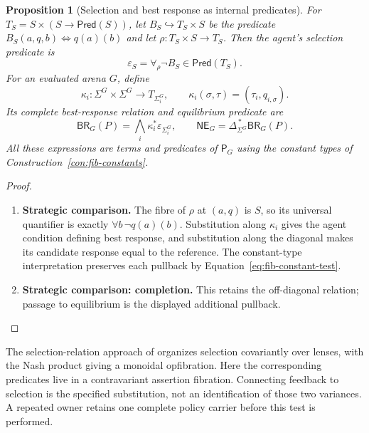 \documentclass[11pt,a4paper]{article}
\numberwithin{equation}{section}
\newtheorem{proposition}[theorem]{Proposition}
\theoremstyle{definition}
\theoremstyle{remark}
\theoremstyle{plain}
\begin{document}
\begin{proposition}[Selection and best response as internal predicates]
\label{prop:fib-selection-internal}
For $T_S=S\times(S\to\mathsf{Pred}(S))$, let
$B_S\hookrightarrow T_S\times S$ be the predicate
$B_S(a,q,b)\iff q(a)(b)$ and let $\rho:T_S\times S\to T_S$.
Then the agent's selection predicate is
\[
 \varepsilon_S=\forall_\rho\neg B_S\in\mathsf{Pred}(T_S).
\]
For an evaluated arena $G$, define
\[
 \kappa_i:\Sigma^G\times\Sigma^G\to T_{\Sigma_i^G},
 \qquad \kappa_i(\sigma,\tau)=(\tau_i,q_{i,\sigma}).
\]
Its complete best-response relation and equilibrium predicate are
\[
 \mathsf{BR}_G(P)=\bigwedge_i\kappa_i^*\varepsilon_{\Sigma_i^G},
 \qquad
 \mathsf{NE}_G=\Delta_{\Sigma^G}^{\,*}\mathsf{BR}_G(P).
\]
All these expressions are terms and predicates of $\mathsf P_G$ using
the constant types of Construction~\ref{con:fib-constants}.
\end{proposition}
\begin{proof}
\leavevmode
\begin{enumerate}[label=\textup{(\arabic*)},leftmargin=*,itemsep=4pt,topsep=3pt]
  \item \textbf{Strategic comparison.} The fibre of $\rho$ at $(a,q)$ is $S$, so its universal quantifier
is exactly $\forall b\,\neg q(a)(b)$. Substitution along $\kappa_i$
gives the agent condition defining best response, and substitution
along the diagonal makes its candidate response equal to the reference. The constant-type interpretation preserves each pullback by
Equation~\eqref{eq:fib-constant-test}.
  \item \textbf{Strategic comparison: completion.} This retains the off-diagonal
relation; passage to equilibrium is the displayed additional pullback.
\end{enumerate}
\end{proof}

The selection-relation approach of
\citet{CapucciEtAl2022Cybernetics,CapucciEtAl2022Agency} organizes
selection covariantly over lenses, with the Nash product giving a
monoidal opfibration. Here the corresponding predicates live in a
contravariant assertion fibration. Connecting feedback to selection is
the specified substitution, not an identification of those two
variances. A repeated owner retains one complete policy carrier before
this test is performed.
\end{document}
